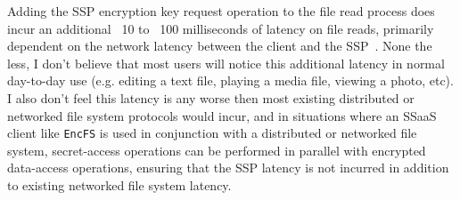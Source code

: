 Adding the SSP encryption key request operation to the file read
process does incur an additional ~10 to ~100 milliseconds of latency
on file reads, primarily dependent on the network latency between the
client and the SSP~\cite{custos-trios}. None the less, I don't believe
that most users will notice this additional latency in normal
day-to-day use (e.g. editing a text file, playing a media file,
viewing a photo, etc). I also don't feel this latency is any worse
then most existing distributed or networked file system protocols
would incur, and in situations where an SSaaS client like
\texttt{EncFS} is used in conjunction with a distributed or networked
file system, secret-access operations can be performed in parallel
with encrypted data-access operations, ensuring that the SSP latency
is not incurred in addition to existing networked file system latency.

